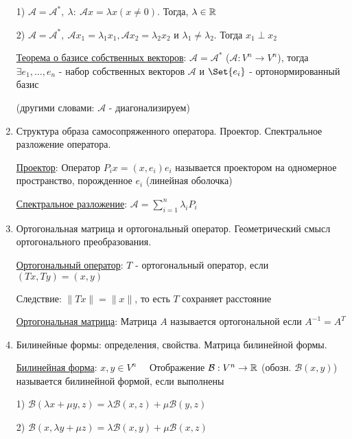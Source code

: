 \documentclass[12pt]{article}
\begin{document}
\begin{enumerate}
        1) $\mathcal{A} = \mathcal{A}^*, \ \lambda : \ \mathcal{A}x = \lambda x (x \neq 0)$. Тогда, $\lambda \in \mathbb{R}$

        2) $\mathcal{A} = \mathcal{A}^*, \ \mathcal{A}x_1 = \lambda_1 x_1, \mathcal{A}x_2 = \lambda_2 x_2$ и $\lambda_1 \neq \lambda_2$. Тогда $x_1 \perp x_2$

        \hyperlink{theoremabouteigenvectorsinselfconjugateoperator}{Теорема о базисе собственных векторов}: $\mathcal{A} = \mathcal{A}^*$ ($\mathcal{A} : V^n \to V^n$),
        тогда $\exists e_1, \dots, e_n$ - набор собственных векторов $\mathcal{A}$ и $\Set{e_i}$ - ортонормированный базис

        (другими словами: $\mathcal{A}$ - диагонализируем)

        \item Структура образа самосопряженного оператора. Проектор. Спектральное разложение оператора.

        \hyperlink{projector}{Проектор}: Оператор $P_i x = (x, e_i) e_i$ называется проектором на одномерное пространство, порожденное $e_i$ (линейная оболочка)

        \hyperlink{spectraldecomposition}{Спектральное разложение}: $\mathcal{A} = \sum_{i = 1}^{n} \lambda_i P_i$

        \item Ортогональная матрица и ортогональный оператор. Геометрический смысл ортогонального преобразования.

        \hyperlink{orthogonaloperator}{Ортогональный оператор}: $T$ - ортогональный оператор, если $(Tx, Ty) = (x, y)$

        Следствие: $\|Tx\| = \|x\|$, то есть $T$ сохраняет расстояние

        \hyperlink{orthogonalmatrix}{Ортогональная матрица}: Матрица $A$ называется ортогональной если $A^{-1} = A^T$



        \item Билинейные формы: определения, свойства. Матрица билинейной формы.

        \hyperlink{bilinearforms}{Билинейная форма}: $x, y \in V^n \quad$ Отображение $\mathcal{B}: V^n \to \mathbb{R}$ (обозн. $\mathcal{B}(x, y)$)
        называется билинейной формой, если выполнены

        1) $\mathcal{B}(\lambda x + \mu y, z) = \lambda \mathcal{B}(x, z) + \mu \mathcal{B}(y, z)$

        2) $\mathcal{B}(x, \lambda y + \mu z) = \lambda \mathcal{B}(x, y) + \mu \mathcal{B}(x, z)$


\end{enumerate}
\end{document}
